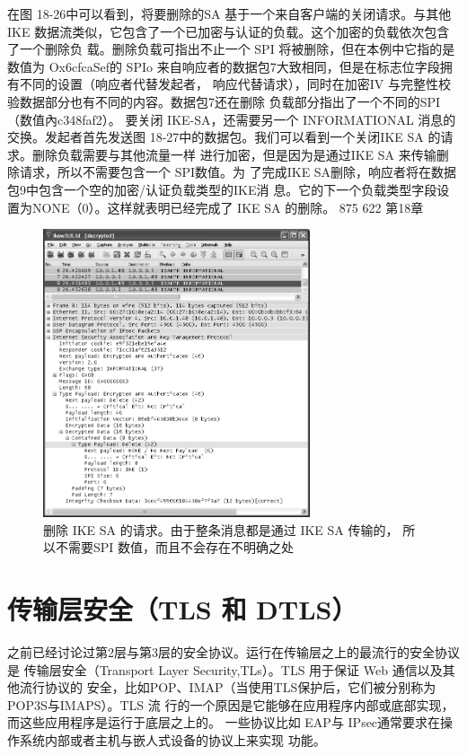 在图 18-26中可以看到，将要删除的SA 基于一个来自客户端的关闭请求。与其他IKE
数据流类似，它包含了一个已加密与认证的负载。这个加密的负载依次包含了一个删除负
载。删除负载可指出不止一个 SPI 将被删除，但在本例中它指的是数值为 Ox6cfcaSef的 SPIo
来自响应者的数据包7大致相同，但是在标志位字段拥有不同的设置（响应者代替发起者，
响应代替请求），同时在加密IV 与完整性校验数据部分也有不同的内容。数据包7还在删除
负载部分指出了一个不同的SPI（数值內c348faf2）。
要关闭 IKE-SA，还需要另一个 INFORMATIONAL 消息的交换。发起者首先发送图
18-27中的数据包。我们可以看到一个关闭IKE SA 的请求。删除负载需要与其他流量一样
进行加密，但是因为是通过IKE SA 来传输删除请求，所以不需要包含一个 SPI数值。为
了完成IKE SA删除，响应者将在数据包9中包含一个空的加密/认证负载类型的IKE消
息。它的下一个负载类型字段设置为NONE（0）。这样就表明已经完成了 IKE SA 的删除。
875
622
第18章
\begin{figure}[!htb]
    \centering
	\includegraphics[width=0.7\textwidth]{imgs/18/18-27.png}
	\caption{删除 IKE SA 的请求。由于整条消息都是通过 IKE SA 传输的，
            所以不需要SPI 数值，而且不会存在不明确之处}
\end{figure}

\section{传输层安全（TLS 和 DTLS）}
之前已经讨论过第2层与第3层的安全协议。运行在传输层之上的最流行的安全协议是
传输层安全（Transport Layer Security,TLs）。TLS 用于保证 Web 通信以及其他流行协议的
安全，比如POP、IMAP（当使用TLS保护后，它们被分别称为POP3S与IMAPS）。TLS 流
行的一个原因是它能够在应用程序内部或底部实现，而这些应用程序是运行于底层之上的。
一些协议比如 EAP与 IPsec通常要求在操作系统内部或者主机与嵌人式设备的协议上来实现
功能。

